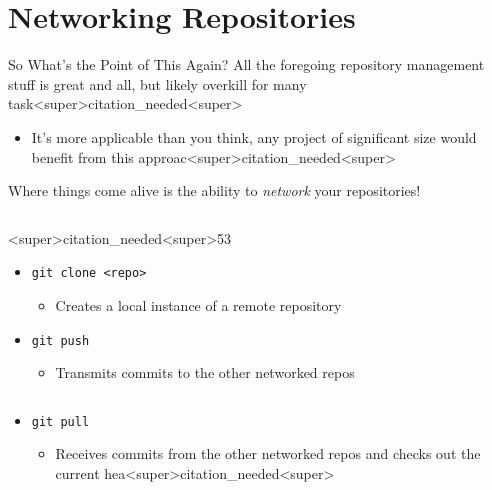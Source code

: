 \documentclass[11pt]{beamer}
\begin{document}
\section[Collaboration]{Networking Repositories}
\begin{frame}{So What's the Point of This Again?}
All the foregoing repository management stuff is great and all, but likely overkill for many task<super>citation_needed<super>
\begin{itemize}
\item It's more applicable than you think, any project of significant size would benefit from this approac<super>citation_needed<super>  
\end{itemize}
Where things come alive is the ability to \emph{network} your repositories! 
\begin{columns}
\begin{column}{<super>citation_needed<super>53\textwidth}
\begin{itemize}
\item \texttt{git clone <repo>}
\begin{itemize}
\item Creates a local instance of a remote repository
\end{itemize}
\item \texttt{git push}
\begin{itemize}
\item Transmits commits to the other networked repos
\end{itemize}
\end{itemize}
\end{column}
\begin{column}{<super>citation_needed<super>29\textwidth}
\fbox{\ \\ 
\end{column}
\end{columns}
\begin{itemize}
\item \texttt{git pull}
\begin{itemize}
\item Receives commits from the other networked repos and checks out the current hea<super>citation_needed<super>
\end{itemize}
\end{itemize}
\end{frame}
\end{document}
